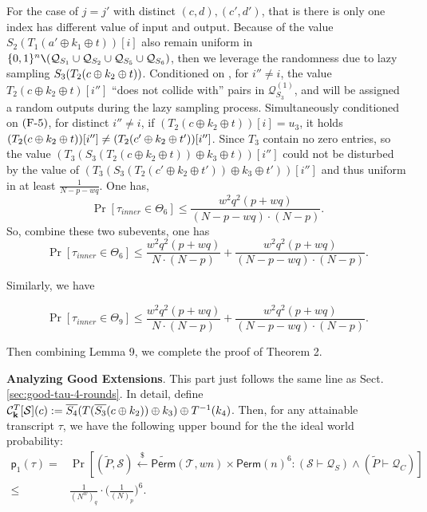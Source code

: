 For the case of $j=j'$ with distinct $(c,d),(c',d')$, that is there is only one index has different value of input and output. Because of the value $S_{2}\left(T_1\left(a' \oplus k_{1} \oplus t\right)\right)[i]$ also remain uniform in $\{0, 1\}^{n} \verb|\| (\mathcal{Q}_{S_{1}} \cup \mathcal{Q}_{S_{2}} \cup \mathcal{Q}_{S_{5}} \cup \mathcal{Q}_{S_{6}})$, then we leverage the randomness due to lazy sampling $S_3(T_2(c\oplus k_2\oplus t))$. Conditioned on \feaiv, for $i''\neq i$, the value $T_2(c \oplus k_2 \oplus t)[i'']$ ``does not collide with'' pairs in $\mathcal{Q}_{S_{3}}^{(1)}$, and will be assigned a random outputs during the lazy sampling process. Simultaneously conditioned on $\text{(F-5)}$, for distinct $i'' \neq i$, if $(T_2\left(c \oplus k_{2} \oplus t\right))[i] = u_3$, it holds $(T_2(c\oplus k_2 \oplus t))[i'']\neq (T_2(c'\oplus k_2 \oplus t'))[i'']$. Since $T_3$ contain no zero entries, so the value $ \left(T_{3}\left(S_{3}\left(T_2\left(c \oplus k_{2} \oplus t\right)\right) \oplus k_{3} \oplus t\right)\right)[i'']$ could not be disturbed by the value of $ \left(T_{3}\left(S_{3}\left(T_2\left(c' \oplus k_{2} \oplus t'\right)\right) \oplus k_{3} \oplus t'\right)\right)[i'']$ and thus uniform in at least $\frac{1}{N - p- wq}$. One has,
$$
\operatorname{Pr}\left[\tau_{inner} \in \Theta_{6}\right] \leq \frac{w^{2} q^{2} (p+w q)}{(N- p- wq) \cdot (N-p)}.
$$
\noindent So, combine these two subevents, one has
$$
\operatorname{Pr}\left[\tau_{inner} \in \Theta_{6}\right] \leq \frac{w^{2} q^{2} (p+w q)}{N \cdot (N-p)} + \frac{w^{2} q^{2} (p+w q)}{(N- p- wq) \cdot (N- p)}.
$$

\noindent Similarly, we have

$$
\operatorname{Pr}\left[\tau_{inner} \in \Theta_{9}\right] \leq \frac{w^{2} q^{2} (p+w q)}{N \cdot (N-p)} + \frac{w^{2} q^{2} (p+w q)}{(N- p- wq) \cdot (N- p)}.
$$

\noindent Then combining Lemma 9, we complete the proof of Theorem 2.






\arrangespace

\noindent \textbf{Analyzing Good Extensions}.
%
This part just follows the same line as Sect. \ref{sec:good-tau-4-rounds}. In detail, define $\mathcal{C}_{\mathbf{k}}^T[\mathcal{S}](c):=   \overline{S_4}(T(\overline{S_3}(c\oplus k_2))\oplus k_3)\oplus T^{-1}(k_4)$. Then, for any attainable transcript $\tau$, we have the following upper bound for the the ideal world probability:
%
%
\begin{align*}
\mathsf{p}_{1}(\tau)=&\operatorname{Pr}\left[(\widetilde{P},\mathcal{S})\stackrel{\$}{\leftarrow} \widetilde{{\mathsf{Perm}}}(\mathcal{T}, w n)\times\mathsf{Perm}(n)^6: (\mathcal{S} \vdash \mathcal{Q}_{S}) \wedge(\widetilde{P} \vdash \mathcal{Q}_{C})  \right]		\\
\leq&\frac{1}{(N^w)_q}\cdot\bigg(\frac{1}{(N)_p}\bigg)^6.
\end{align*}



